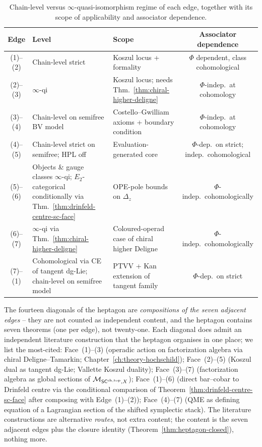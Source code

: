 \begin{table}[h]
\centering
\begin{tabular}{cllc}
\toprule
Edge & Level & Scope & Associator dependence \\
\midrule
(1)--(2) & Chain-level strict & Koszul locus + formality & $\Phi$
dependent, class cohomological \\
(2)--(3) & $\infty$-qi & Koszul locus; needs
Thm.~\ref{thm:chiral-higher-deligne} & $\Phi$-indep.\ at
cohomology \\
(3)--(4) & Chain-level on semifree BV model & Costello--Gwilliam
axioms + boundary condition & $\Phi$-indep.\ at cohomology \\
(4)--(5) & Chain-level strict on semifree; HPL off & Evaluation-generated
core & $\Phi$-dep.\ on strict; indep.\ cohomological \\
(5)--(6) & Objects \& gauge classes $\infty$-qi;
$E_2$-categorical conditionally via
Thm.~\ref{thm:drinfeld-centre-sc-face}
& OPE-pole bounds on
$\Delta_z$ & $\Phi$-indep.\ cohomologically \\
(6)--(7) & $\infty$-qi via
Thm.~\ref{thm:chiral-higher-deligne} & Coloured-operad case
of chiral higher Deligne & $\Phi$-indep.\ cohomologically \\
(7)--(1) & Cohomological via CE of tangent dg-Lie; chain-level on
semifree model & PTVV + Kan extension of tangent family &
$\Phi$-dep.\ on strict \\
\bottomrule
\end{tabular}
\caption{Chain-level versus $\infty$-quasi-isomorphism regime of each
edge, together with its scope of applicability and associator
dependence.}
\label{tab:heptagon-edges-regime}
\end{table}

\begin{remark}\label{rem:heptagon-diagonals}%
The fourteen diagonals of the heptagon are \emph{compositions of the
seven adjacent edges} -- they are not counted as independent content,
and the heptagon contains seven theorems (one per edge), not
twenty-one. Each diagonal does admit an independent literature
construction that the heptagon organises in one place; we list
the most-cited:
Face~(1)--(3) (operadic action on factorization algebra via chiral
Deligne--Tamarkin; Chapter~\ref{ch:theory-hochschild});
Face~(2)--(5) (Koszul dual as tangent dg-Lie; Vallette Koszul duality);
Face~(3)--(7) (factorization algebra as global sections of
$\mathcal{M}_{\mathsf{SC}^{\mathrm{ch},\mathrm{top}},X}$); Face~(1)--(6) (direct bar--cobar to Drinfeld centre
via the conditional comparison of
Theorem~\ref{thm:drinfeld-centre-sc-face} after composing with
Edge~(1)--(2)); Face~(4)--(7) (QME as defining equation of a Lagrangian
section of the shifted symplectic stack). The literature
constructions are alternative \emph{routes}, not extra content; the
content is the seven adjacent edges plus the closure
identity (Theorem~\ref{thm:heptagon-closed}), nothing more.
\end{remark}

